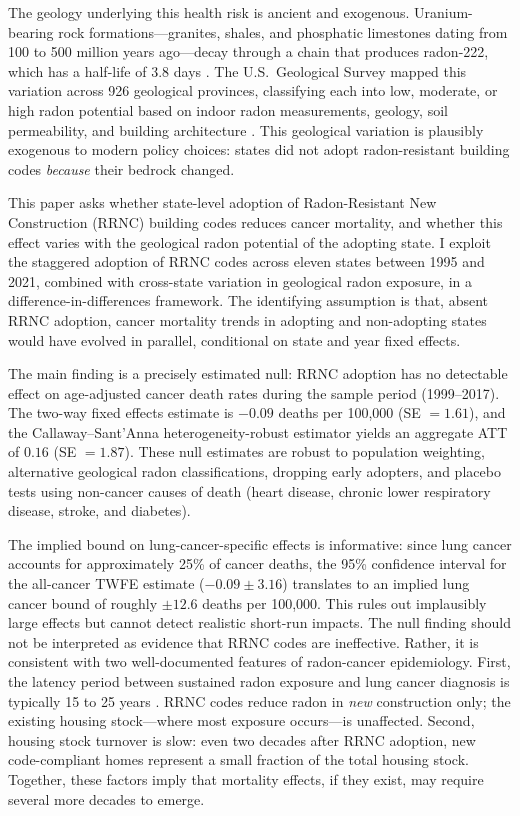 \documentclass[12pt]{article}
\begin{document}
The geology underlying this health risk is ancient and exogenous. Uranium-bearing rock formations---granites, shales, and phosphatic limestones dating from 100 to 500 million years ago---decay through a chain that produces radon-222, which has a half-life of 3.8 days \citep{nero1986radon}. The U.S.\ Geological Survey mapped this variation across 926 geological provinces, classifying each into low, moderate, or high radon potential based on indoor radon measurements, geology, soil permeability, and building architecture \citep{gundersen1993geologic}. This geological variation is plausibly exogenous to modern policy choices: states did not adopt radon-resistant building codes \emph{because} their bedrock changed.

This paper asks whether state-level adoption of Radon-Resistant New Construction (RRNC) building codes reduces cancer mortality, and whether this effect varies with the geological radon potential of the adopting state. I exploit the staggered adoption of RRNC codes across eleven states between 1995 and 2021, combined with cross-state variation in geological radon exposure, in a difference-in-differences framework. The identifying assumption is that, absent RRNC adoption, cancer mortality trends in adopting and non-adopting states would have evolved in parallel, conditional on state and year fixed effects.

The main finding is a precisely estimated null: RRNC adoption has no detectable effect on age-adjusted cancer death rates during the sample period (1999--2017). The two-way fixed effects estimate is $-0.09$ deaths per 100,000 (SE $= 1.61$), and the Callaway--Sant'Anna heterogeneity-robust estimator yields an aggregate ATT of $0.16$ (SE $= 1.87$). These null estimates are robust to population weighting, alternative geological radon classifications, dropping early adopters, and placebo tests using non-cancer causes of death (heart disease, chronic lower respiratory disease, stroke, and diabetes).

The implied bound on lung-cancer-specific effects is informative: since lung cancer accounts for approximately 25\% of cancer deaths, the 95\% confidence interval for the all-cancer TWFE estimate ($-0.09 \pm 3.16$) translates to an implied lung cancer bound of roughly $\pm 12.6$ deaths per 100,000. This rules out implausibly large effects but cannot detect realistic short-run impacts. The null finding should not be interpreted as evidence that RRNC codes are ineffective. Rather, it is consistent with two well-documented features of radon-cancer epidemiology. First, the latency period between sustained radon exposure and lung cancer diagnosis is typically 15 to 25 years \citep{darby2005radon, krewski2005residential}. RRNC codes reduce radon in \emph{new} construction only; the existing housing stock---where most exposure occurs---is unaffected. Second, housing stock turnover is slow: even two decades after RRNC adoption, new code-compliant homes represent a small fraction of the total housing stock. Together, these factors imply that mortality effects, if they exist, may require several more decades to emerge.
\end{document}
